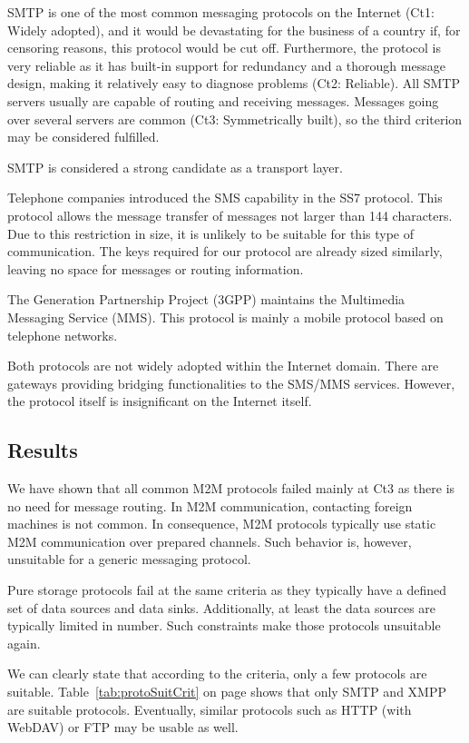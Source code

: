 SMTP is one of the most common messaging protocols on the Internet (Ct1: Widely adopted), and it would be devastating for the business of a country if, for censoring reasons, this protocol would be cut off. Furthermore, the protocol is very reliable as it has built-in support for redundancy and a thorough message design, making it relatively easy to diagnose problems (Ct2: Reliable). All SMTP servers usually are capable of routing and receiving messages. Messages going over several servers are common (Ct3: Symmetrically built), so the third criterion may be considered fulfilled.

SMTP is considered a strong candidate as a transport layer.  

Telephone companies introduced the SMS capability in the SS7 protocol. This protocol allows the message transfer of messages not larger than 144 characters. Due to this restriction in size, it is unlikely to be suitable for this type of communication. The keys required for our protocol are already sized similarly, leaving no space for messages or routing information.

The  Generation Partnership Project (3GPP) maintains the Multimedia Messaging Service (MMS). This protocol is mainly a mobile protocol based on telephone networks.

Both protocols are not widely adopted within the Internet domain. There are gateways providing bridging functionalities to the SMS/MMS services. However, the protocol itself is insignificant on the Internet itself. 

\subsection{Results}
We have shown that all common M2M protocols failed mainly at Ct3 as there is no need for message routing. In M2M communication, contacting foreign machines is not common. In consequence, M2M protocols typically use static M2M communication over prepared channels. Such behavior is, however, unsuitable for a generic messaging protocol.

Pure storage protocols fail at the same criteria as they typically have a defined set of data sources and data sinks. Additionally, at least the data sources are typically limited in number. Such constraints make those protocols unsuitable again.

We can clearly state that according to the criteria, only a few protocols are suitable. Table~\ref{tab:protoSuitCrit} on page \pageref{tab:protoSuitCrit} shows that only SMTP and XMPP are suitable protocols. Eventually, similar protocols such as HTTP (with WebDAV) or FTP may be usable as well. 

